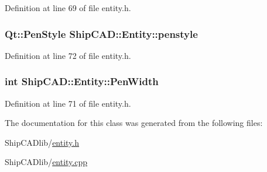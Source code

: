 Definition at line 69 of file entity.\-h.

\hypertarget{classShipCAD_1_1Entity_a8cbcbada188edd9d39e7c5743dc43560}{
\subsubsection[{penstyle}]{\setlength{\rightskip}{0pt plus 5cm}Qt\-::\-Pen\-Style Ship\-C\-A\-D\-::\-Entity\-::penstyle}}\label{classShipCAD_1_1Entity_a8cbcbada188edd9d39e7c5743dc43560}


Definition at line 72 of file entity.\-h.

\hypertarget{classShipCAD_1_1Entity_a95a1cc38c08e5b64a540727afb99d25a}{
\subsubsection[{Pen\-Width}]{\setlength{\rightskip}{0pt plus 5cm}int Ship\-C\-A\-D\-::\-Entity\-::\-Pen\-Width}}\label{classShipCAD_1_1Entity_a95a1cc38c08e5b64a540727afb99d25a}


Definition at line 71 of file entity.\-h.



The documentation for this class was generated from the following files\-:\begin{DoxyCompactItemize}
\item 
Ship\-C\-A\-Dlib/\hyperlink{entity_8h}{entity.\-h}\item 
Ship\-C\-A\-Dlib/\hyperlink{entity_8cpp}{entity.\-cpp}\end{DoxyCompactItemize}
